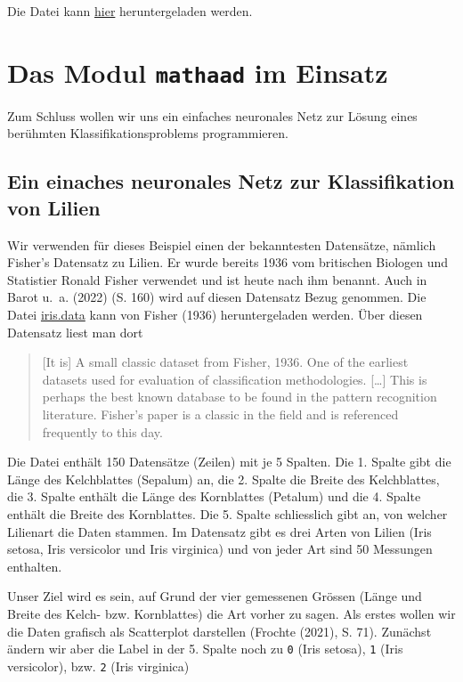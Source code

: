 \documentclass[
  a4paper,
  DIV=11]{scrreprt}
\theoremstyle{definition}
\theoremstyle{definition}
\theoremstyle{remark}
\begin{document}
Die Datei kann \href{mathaad.py}{hier} heruntergeladen werden.

\hypertarget{das-modul-mathaad-im-einsatz}{%
\section{\texorpdfstring{Das Modul \texttt{mathaad} im
Einsatz}{Das Modul mathaad im Einsatz}}\label{das-modul-mathaad-im-einsatz}}

Zum Schluss wollen wir uns ein einfaches neuronales Netz zur Lösung
eines berühmten Klassifikationsproblems programmieren.

\hypertarget{ein-einaches-neuronales-netz-zur-klassifikation-von-lilien}{%
\subsection{Ein einaches neuronales Netz zur Klassifikation von
Lilien}\label{ein-einaches-neuronales-netz-zur-klassifikation-von-lilien}}

Wir verwenden für dieses Beispiel einen der bekanntesten Datensätze,
nämlich Fisher's Datensatz zu Lilien. Er wurde bereits 1936 vom
britischen Biologen und Statistier Ronald Fisher verwendet und ist heute
nach ihm benannt. Auch in Barot u.~a. (2022) (S. 160) wird auf diesen
Datensatz Bezug genommen. Die Datei \url{iris.data} kann von Fisher
(1936) heruntergeladen werden. Über diesen Datensatz liest man dort

\begin{quote}
{[}It is{]} A small classic dataset from Fisher, 1936. One of the
earliest datasets used for evaluation of classification methodologies.
{[}\ldots{]} This is perhaps the best known database to be found in the
pattern recognition literature. Fisher's paper is a classic in the field
and is referenced frequently to this day.
\end{quote}

Die Datei enthält 150 Datensätze (Zeilen) mit je 5 Spalten. Die 1.
Spalte gibt die Länge des Kelchblattes (Sepalum) an, die 2. Spalte die
Breite des Kelchblattes, die 3. Spalte enthält die Länge des Kornblattes
(Petalum) und die 4. Spalte enthält die Breite des Kornblattes. Die 5.
Spalte schliesslich gibt an, von welcher Lilienart die Daten stammen. Im
Datensatz gibt es drei Arten von Lilien (Iris setosa, Iris versicolor
und Iris virginica) und von jeder Art sind 50 Messungen enthalten.

Unser Ziel wird es sein, auf Grund der vier gemessenen Grössen (Länge
und Breite des Kelch- bzw. Kornblattes) die Art vorher zu sagen. Als
erstes wollen wir die Daten grafisch als Scatterplot darstellen (Frochte
(2021), S. 71). Zunächst ändern wir aber die Label in der 5. Spalte noch
zu \texttt{0} (Iris setosa), \texttt{1} (Iris versicolor), bzw.
\texttt{2} (Iris virginica)
\end{document}
